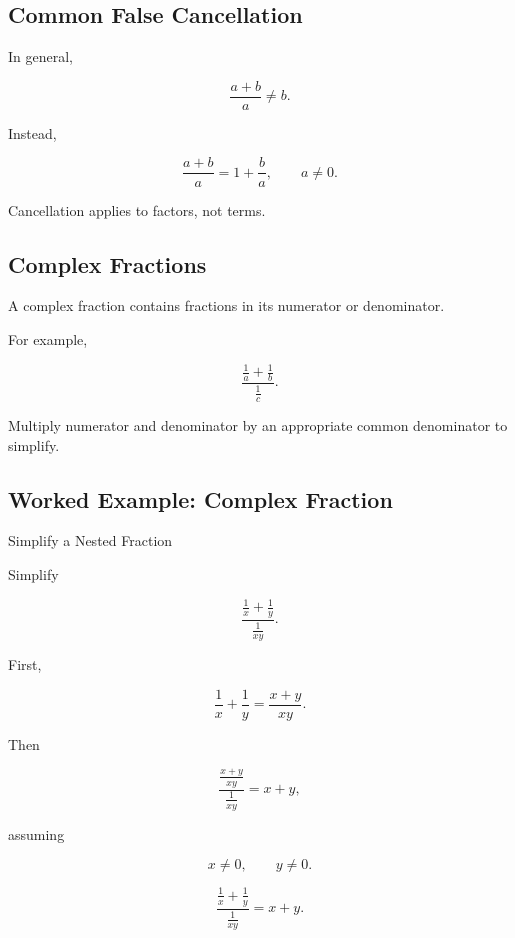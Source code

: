 \subsection{Common False Cancellation}
\label{subsec:false-cancellation}

In general,

\[
\boxed{
\frac{a+b}{a}
\neq
b.
}
\]

Instead,

\[
\boxed{
\frac{a+b}{a}
=
1+\frac{b}{a},
\qquad
a\neq0.
}
\]

Cancellation applies to factors, not terms.

\subsection{Complex Fractions}
\label{subsec:complex-fractions-reference}

A complex fraction contains fractions in its numerator or denominator.

For example,

\[
\frac{
\frac1a+\frac1b
}{
\frac1c
}.
\]

Multiply numerator and denominator by an appropriate common denominator to
simplify.

\subsection{Worked Example: Complex Fraction}
\label{subsec:worked-complex-fraction}

\begin{workedexamplebox}{Simplify a Nested Fraction}

Simplify

\[
\frac{
\frac1x+\frac1y
}{
\frac1{xy}
}.
\]

First,

\[
\frac1x+\frac1y
=
\frac{x+y}{xy}.
\]

Then

\[
\frac{
\frac{x+y}{xy}
}{
\frac1{xy}
}
=
x+y,
\]

assuming

\[
x\neq0,
\qquad
y\neq0.
\]

\begin{answerbox}
\[
\boxed{
\frac{
\frac1x+\frac1y
}{
\frac1{xy}
}
=
x+y.
}
\]
\end{answerbox}

\end{workedexamplebox}

